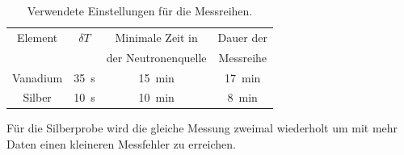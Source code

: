 \begin{table}%
    \begin{tabular}{c c c c}%
        \toprule%
        Element  & $\delta T$ & Minimale Zeit in       & Dauer der\\%
                 &            & der Neutronenquelle    & Messreihe\\%
        \midrule        %
        Vanadium & \qty{35}{\s}   &  \qty{15}{\minute} & \qty{17}{\minute}\\%
        Silber   & \qty{10}{\s}   &  \qty{10}{\minute} & \qty{8}{\minute}\\%
    \end{tabular}%
    \caption{Verwendete Einstellungen für die Messreihen.}%
    \label{tab:zeiten}%
\end{table}%
Für die Silberprobe wird die gleiche Messung zweimal wiederholt um mit 
mehr Daten einen kleineren Messfehler zu erreichen.
